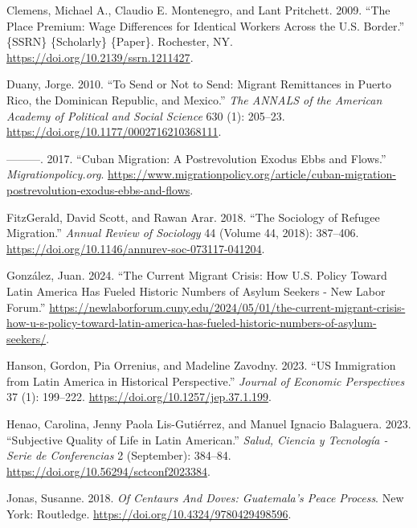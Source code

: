 \documentclass[
]{article}
\newlength{\cslhangindent}
\newenvironment{CSLReferences}[2] %
 {\begin{list}{}{%
  \setlength{\itemindent}{0pt}
  \setlength{\leftmargin}{0pt}
  \setlength{\parsep}{0pt}
  \ifodd #1
   \setlength{\leftmargin}{\cslhangindent}
   \setlength{\itemindent}{-1\cslhangindent}
  \fi
  \setlength{\itemsep}{#2\baselineskip}}}
 {\end{list}}
\begin{document}
\begin{CSLReferences}{1}{0}
Clemens, Michael A., Claudio E. Montenegro, and Lant Pritchett. 2009.
{``The {Place} {Premium}: {Wage} {Differences} for {Identical} {Workers}
{Across} the {U}.{S}. {Border}.''} \{SSRN\} \{Scholarly\} \{Paper\}.
Rochester, NY. \url{https://doi.org/10.2139/ssrn.1211427}.

Duany, Jorge. 2010. {``To {Send} or {Not} to {Send}: {Migrant}
{Remittances} in {Puerto} {Rico}, the {Dominican} {Republic}, and
{Mexico}.''} \emph{The ANNALS of the American Academy of Political and
Social Science} 630 (1): 205--23.
\url{https://doi.org/10.1177/0002716210368111}.

---------. 2017. {``Cuban {Migration}: {A} {Postrevolution} {Exodus}
{Ebbs} and {Flows}.''} \emph{Migrationpolicy.org}.
\url{https://www.migrationpolicy.org/article/cuban-migration-postrevolution-exodus-ebbs-and-flows}.

FitzGerald, David Scott, and Rawan Arar. 2018. {``The {Sociology} of
{Refugee} {Migration}.''} \emph{Annual Review of Sociology} 44 (Volume
44, 2018): 387--406.
\url{https://doi.org/10.1146/annurev-soc-073117-041204}.

González, Juan. 2024. {``The {Current} {Migrant} {Crisis}: {How}
{U}.{S}. {Policy} {Toward} {Latin} {America} {Has} {Fueled} {Historic}
{Numbers} of {Asylum} {Seekers} - {New} {Labor} {Forum}.''}
\url{https://newlaborforum.cuny.edu/2024/05/01/the-current-migrant-crisis-how-u-s-policy-toward-latin-america-has-fueled-historic-numbers-of-asylum-seekers/}.

Hanson, Gordon, Pia Orrenius, and Madeline Zavodny. 2023. {``{US}
{Immigration} from {Latin} {America} in {Historical} {Perspective}.''}
\emph{Journal of Economic Perspectives} 37 (1): 199--222.
\url{https://doi.org/10.1257/jep.37.1.199}.

Henao, Carolina, Jenny Paola Lis-Gutiérrez, and Manuel Ignacio
Balaguera. 2023. {``Subjective {Quality} of {Life} in {Latin}
{American}.''} \emph{Salud, Ciencia y Tecnología - Serie de
Conferencias} 2 (September): 384--84.
\url{https://doi.org/10.56294/sctconf2023384}.

Jonas, Susanne. 2018. \emph{Of {Centaurs} {And} {Doves}: {Guatemala}'s
{Peace} {Process}}. New York: Routledge.
\url{https://doi.org/10.4324/9780429498596}.


\end{CSLReferences}
\end{document}

